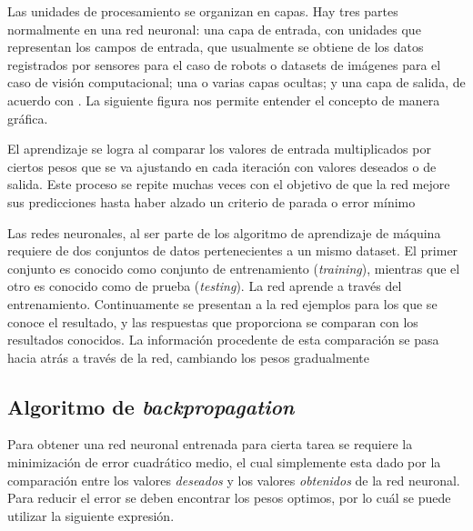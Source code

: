 \documentclass[12pt]{article}
\begin{document}
  Las unidades de procesamiento se organizan en capas. Hay tres partes
  normalmente en una red neuronal: una capa de entrada, con unidades que
  representan los campos de entrada, que usualmente se obtiene de los datos
  registrados por sensores para el caso de robots o datasets de imágenes para el
  caso de visión computacional; una o varias capas ocultas; y una capa de
  salida, de acuerdo con \cite[p.~215]{ibm}. La siguiente figura nos permite
  entender el concepto de manera gráfica.

  \begin{center}
  \end{center}

  El aprendizaje se logra al comparar los valores de entrada multiplicados por
  ciertos pesos que se va ajustando en cada iteración con valores deseados o de
  salida. Este proceso se repite muchas veces con el objetivo de que la red
  mejore sus predicciones hasta haber alzado un criterio de parada o error
  mínimo \cite{savage,ibm}

  Las redes neuronales, al ser parte de los algoritmo de aprendizaje de máquina
  requiere de dos conjuntos de datos pertenecientes a un mismo dataset. El
  primer conjunto es conocido como conjunto de entrenamiento (\textit{training}),
  mientras que el otro es conocido como de prueba (\textit{testing}). La red
  aprende a través del entrenamiento. Continuamente se presentan a la red
  ejemplos para los que se conoce el resultado, y las respuestas que proporciona
  se comparan con los resultados conocidos. La información procedente de esta
  comparación se pasa hacia atrás a través de la red, cambiando los pesos
  gradualmente \cite{minksy}

  \subsection*{Algoritmo de \textit{backpropagation}}

  Para obtener una red neuronal entrenada para cierta tarea se requiere la
  minimización de error cuadrático medio, el cual simplemente esta dado por la
  comparación entre los valores \textit{deseados} y los valores
  \textit{obtenidos} de la red neuronal. Para reducir el error se deben
  encontrar los pesos optimos, por lo cuál se puede utilizar la siguiente
  expresión.
\end{document}
